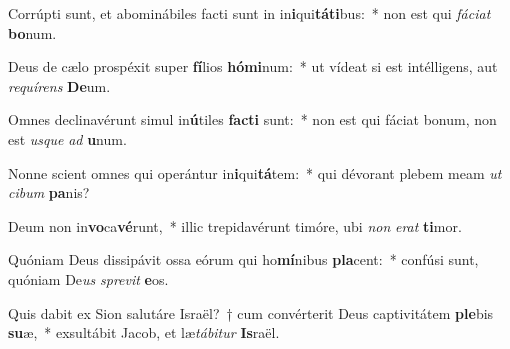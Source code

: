 \item Corrúpti sunt, et abominábiles facti sunt in in\textbf{i}qui\textbf{tá}\textbf{ti}bus:~* non est qui \textit{fá}\textit{ci}\textit{at} \textbf{bo}num.
\item Deus de cælo prospéxit super \textbf{fí}lios \textbf{hó}\textbf{mi}num:~* ut vídeat si est intélligens, aut \textit{re}\textit{quí}\textit{rens} \textbf{De}um.
\item Omnes declinavérunt simul in\textbf{ú}tiles \textbf{fac}\textbf{ti} sunt:~* non est qui fáciat bonum, non est \textit{us}\textit{que} \textit{ad} \textbf{u}num.
\item Nonne scient omnes qui operántur in\textbf{i}qui\textbf{tá}tem:~* qui dévorant plebem meam \textit{ut} \textit{ci}\textit{bum} \textbf{pa}nis?
\item Deum non in\textbf{vo}ca\textbf{vé}runt,~* illic trepidavérunt timóre, ubi \textit{non} \textit{e}\textit{rat} \textbf{ti}mor.
\item Quóniam Deus dissipávit ossa eórum qui ho\textbf{mí}nibus \textbf{pla}cent:~* confúsi sunt, quóniam De\textit{us} \textit{spre}\textit{vit} \textbf{e}os.
\item Quis dabit ex Sion salutáre Israël?~† cum convérterit Deus captivitátem \textbf{ple}bis \textbf{su}æ,~* exsultábit Jacob, et læ\textit{tá}\textit{bi}\textit{tur} \textbf{Is}raël.
